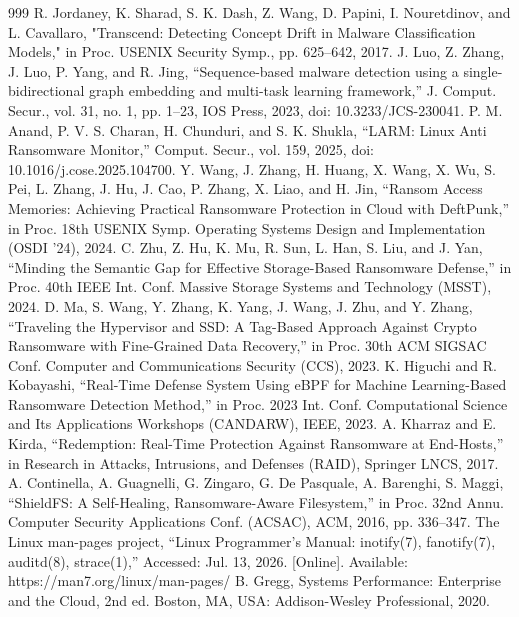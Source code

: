 \begin{thebibliography}{999}
 R. Jordaney, K. Sharad, S. K. Dash, Z. Wang, D. Papini, I. Nouretdinov, and L. Cavallaro, "Transcend: Detecting Concept Drift in Malware Classification Models," in Proc. USENIX Security Symp., pp. 625--642, 2017.
 J. Luo, Z. Zhang, J. Luo, P. Yang, and R. Jing, ``Sequence-based malware detection using a single-bidirectional graph embedding and multi-task learning framework,'' J. Comput. Secur., vol. 31, no. 1, pp. 1--23, IOS Press, 2023, doi: 10.3233/\allowbreak{}JCS-230041.
 P. M. Anand, P. V. S. Charan, H. Chunduri, and S. K. Shukla, ``LARM: Linux Anti Ransomware Monitor,'' Comput. Secur., vol. 159, 2025, doi: 10.1016/\allowbreak{}j.cose.2025.104700.
 Y. Wang, J. Zhang, H. Huang, X. Wang, X. Wu, S. Pei, L. Zhang, J. Hu, J. Cao, P. Zhang, X. Liao, and H. Jin, ``Ransom Access Memories: Achieving Practical Ransomware Protection in Cloud with DeftPunk,'' in Proc. 18th USENIX Symp. Operating Systems Design and Implementation (OSDI '24), 2024.
 C. Zhu, Z. Hu, K. Mu, R. Sun, L. Han, S. Liu, and J. Yan, ``Minding the Semantic Gap for Effective Storage-Based Ransomware Defense,'' in Proc. 40th IEEE Int. Conf. Massive Storage Systems and Technology (MSST), 2024.
 D. Ma, S. Wang, Y. Zhang, K. Yang, J. Wang, J. Zhu, and Y. Zhang, ``Traveling the Hypervisor and SSD: A Tag-Based Approach Against Crypto Ransomware with Fine-Grained Data Recovery,'' in Proc. 30th ACM SIGSAC Conf. Computer and Communications Security (CCS), 2023.
 K. Higuchi and R. Kobayashi, ``Real-Time Defense System Using eBPF for Machine Learning-Based Ransomware Detection Method,'' in Proc. 2023 Int. Conf. Computational Science and Its Applications Workshops (CANDARW), IEEE, 2023.
 A. Kharraz and E. Kirda, ``Redemption: Real-Time Protection Against Ransomware at End-Hosts,'' in Research in Attacks, Intrusions, and Defenses (RAID), Springer LNCS, 2017.
 A. Continella, A. Guagnelli, G. Zingaro, G. De Pasquale, A. Barenghi, S. Maggi, ``ShieldFS: A Self-Healing, Ransomware-Aware Filesystem,'' in Proc. 32nd Annu. Computer Security Applications Conf. (ACSAC), ACM, 2016, pp. 336--347.
 The Linux man-pages project, ``Linux Programmer's Manual: inotify(7), fanotify(7), auditd(8), strace(1),'' Accessed: Jul. 13, 2026. [Online]. Available: https:/\allowbreak{}/\allowbreak{}man7.org/\allowbreak{}linux/\allowbreak{}man-pages/\allowbreak{}
 B. Gregg, Systems Performance: Enterprise and the Cloud, 2nd ed. Boston, MA, USA: Addison-Wesley Professional, 2020.

\end{thebibliography}
